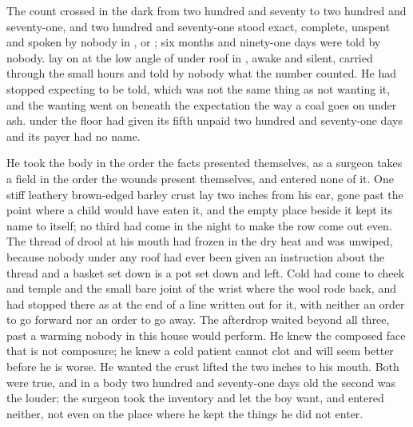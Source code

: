 
The count crossed in the dark from two hundred and seventy to two hundred and seventy-one, and two hundred and seventy-one stood exact, complete, unspent and spoken by nobody in ,  or ; six months and ninety-one days were told by nobody.  lay on  at the low angle of  under  roof in , awake and silent, carried through the small hours and told by nobody what the number counted. He had stopped expecting to be told, which was not the same thing as not wanting it, and the wanting went on beneath the expectation the way a coal goes on under ash.  under the floor had given its fifth unpaid two hundred and seventy-one days and its payer had no name.

He took the body in the order the facts presented themselves, as a surgeon takes a field in the order the wounds present themselves, and entered none of it. One stiff leathery brown-edged barley crust lay two inches from his ear, gone past the point where a child would have eaten it, and the empty place beside it kept its name to itself; no third had come in the night to make the row come out even. The thread of drool at his mouth had frozen in the dry heat and was unwiped, because nobody under any roof had ever been given an instruction about the thread and a basket set down is a pot set down and left. Cold had come to cheek and temple and the small bare joint of the wrist where the wool rode back, and had stopped there as at the end of a line written out for it, with neither an order to go forward nor an order to go away. The afterdrop waited beyond all three, past a warming nobody in this house would perform. He knew the composed face that is not composure; he knew a cold patient cannot clot and will seem better before he is worse. He wanted the crust lifted the two inches to his mouth. Both were true, and in a body two hundred and seventy-one days old the second was the louder; the surgeon took the inventory and let the boy want, and entered neither, not even on the place where he kept the things he did not enter.

